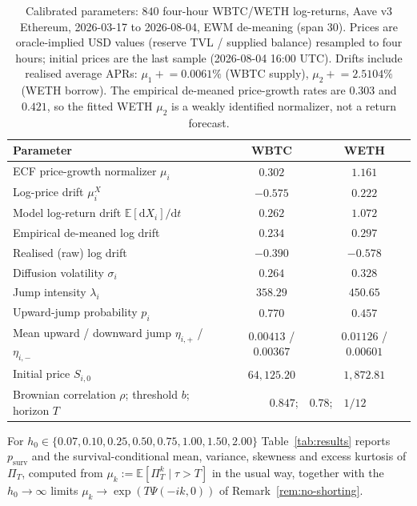 \documentclass[11pt]{article}
\newcommand{\E}{\mathbb{E}}
\newcommand{\diff}{\mathrm{d}}
\theoremstyle{plain}
\theoremstyle{definition}
\theoremstyle{remark}
\begin{document}
\begin{table}[ht]
\centering\small
\renewcommand{\arraystretch}{1.15}
\begin{tabular}{lcc}
\toprule
Parameter & WBTC & WETH \\
\midrule
ECF price-growth normalizer $\mu_i$ & $0.302$ & $1.161$ \\
Log-price drift $\mu_i^X$ & $-0.575$ & $0.222$ \\
Model log-return drift $\E[\diff X_i]/\diff t$ & $0.262$ & $1.072$ \\
Empirical de-meaned log drift & $0.234$ & $0.297$ \\
Realised (raw) log drift & $-0.390$ & $-0.578$ \\
Diffusion volatility $\sigma_i$ & $0.264$ & $0.328$ \\
Jump intensity $\lambda_i$ & $358.29$ & $450.65$ \\
Upward-jump probability $p_i$ & $0.770$ & $0.457$ \\
Mean upward / downward jump $\eta_{i,+}$ / $\eta_{i,-}$ & $0.00413$ / $0.00367$ & $0.01126$ / $0.00601$ \\
Initial price $S_{i,0}$ & $64{,}125.20$ & $1{,}872.81$ \\
\midrule
Brownian correlation $\rho$; threshold $b$; horizon $T$ & \multicolumn{2}{c}{$0.847$;\ \ $0.78$;\ \ $1/12$} \\
\bottomrule
\end{tabular}
\caption{Calibrated parameters: $840$ four-hour WBTC/WETH log-returns, Aave v3 Ethereum,
2026-03-17 to 2026-08-04, EWM de-meaning (span 30). Prices are oracle-implied USD values (reserve
TVL / supplied balance) resampled to four hours; initial prices are the last sample (2026-08-04 16:00
UTC). Drifts include realised average APRs: $\mu_1\mathrel{+}=0.0061\%$ (WBTC supply),
$\mu_2\mathrel{+}=2.5104\%$ (WETH borrow). The empirical de-meaned price-growth rates are $0.303$ and
$0.421$, so the fitted WETH $\mu_2$ is a weakly identified normalizer, not a return forecast.}
\label{tab:num-params}
\end{table}

For $h_0\in\{0.07,0.10,0.25,0.50,0.75,1.00,1.50,2.00\}$ Table~\ref{tab:results} reports
$p_{\mathrm{surv}}$ and the survival-conditional mean, variance, skewness and excess kurtosis of
$\Pi_T$, computed from $\mu_k:=\E[\Pi_T^k\mid\tau>T]$ in the usual way, together with the
$h_0\to\infty$ limits $\mu_k\to\exp(T\Psi(-ik,0))$ of Remark~\ref{rem:no-shorting}.
\end{document}
